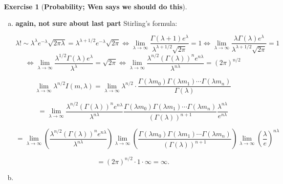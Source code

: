 \documentclass{article}
\theoremstyle{definition}
\newtheorem{exercise}{Exercise}
\theoremstyle{definition}
\theoremstyle{definition}
\theoremstyle{definition}
\begin{document}
\begin{exercise}[\textbf{Probability; Wen says we should do this}]
\begin{enumerate}[(a)]
%
%

\item \textbf{again, not sure about last part} Stirling's formula: 

\[
\lambda! \sim \lambda^\lambda e^{-\lambda} \sqrt{2\pi \lambda} = \lambda^{\lambda + 1/2} e^{-\lambda} \sqrt{2\pi } \iff \lim_{\lambda \to \infty} \frac{ \Gamma(\lambda+1) e^\lambda}{\lambda^{\lambda + 1/2}  \sqrt{2\pi }} = 1 \iff \lim_{\lambda \to \infty} \frac{\lambda \Gamma(\lambda) e^\lambda}{\lambda^{\lambda + 1/2}  \sqrt{2\pi }} = 1
\]
\[
 \iff \lim_{\lambda \to \infty} \frac{ \lambda^{1/2} \Gamma(\lambda) e^\lambda}{\lambda^{\lambda}  } = \sqrt{2\pi }  \iff \lim_{\lambda \to \infty} \frac{ \lambda^{n/2} \left( \Gamma(\lambda) \right)^n e^{n\lambda}}{\lambda^{n\lambda}  } = (2\pi )^{n/2}
\]

%
%


\[
\lim_{\lambda \to \infty} \lambda^{n/2} I(m, \lambda) = \lim_{\lambda \to \infty} \lambda^{n/2} \cdot \frac{\Gamma(\lambda m_0) \Gamma(\lambda m_1) \cdots \Gamma(\lambda m_n)}{\Gamma(\lambda)} 
\]

\[
= \lim_{\lambda \to \infty} \frac{ \lambda^{n/2} \left( \Gamma(\lambda) \right)^n e^{n \lambda}}{\lambda^{n\lambda}  }  \frac{\Gamma(\lambda m_0) \Gamma(\lambda m_1) \cdots \Gamma(\lambda m_n)}{(\Gamma(\lambda))^{n+1}} \frac{\lambda^{n \lambda}}{e^{n \lambda}}
\]

\[
= \lim_{\lambda \to \infty}  \left( \frac{ \lambda^{n/2} \left( \Gamma(\lambda) \right)^n e^{n \lambda}}{\lambda^{n\lambda}  }  \right) \lim_{\lambda \to \infty}  \left( \frac{\Gamma(\lambda m_0) \Gamma(\lambda m_1) \cdots \Gamma(\lambda m_n)}{(\Gamma(\lambda))^{n+1}} \right) \lim_{\lambda \to \infty}  \left( \frac{\lambda}{e} \right) ^{n \lambda}
\]

\[
= (2\pi )^{n/2} \cdot 1 \cdot \infty = \infty.
\]

\item

\


\end{enumerate}
\end{exercise}
\end{document}
